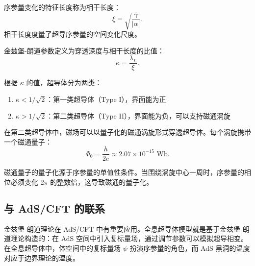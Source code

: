 \begin{definition}[相干长度]
序参量变化的特征长度称为相干长度：
\begin{equation}
    \xi = \sqrt{\frac{\gamma}{|\alpha|}}.
\end{equation}
相干长度度量了超导序参量的空间变化尺度。
\end{definition}

\begin{definition}
金兹堡-朗道参数定义为穿透深度与相干长度的比值：
\begin{equation}
    \kappa = \frac{\lambda_L}{\xi}.
\end{equation}
\end{definition}

\begin{property}[超导体分类]
根据 $\kappa$ 的值，超导体分为两类：
\begin{enumerate}
    \item $\kappa < 1/\sqrt{2}$：第一类超导体（Type I），界面能为正
    \item $\kappa > 1/\sqrt{2}$：第二类超导体（Type II），界面能为负，可以支持磁通涡旋
\end{enumerate}
\end{property}

\begin{definition}[磁通量子]
在第二类超导体中，磁场可以以量子化的磁通涡旋形式穿透超导体。每个涡旋携带一个磁通量子：
\begin{equation}
    \Phi_0 = \frac{h}{2e} \approx 2.07 \times 10^{-15} \text{ Wb}.
\end{equation}
\end{definition}

\begin{remark}
磁通量子的量子化源于序参量的单值性条件。当围绕涡旋中心一周时，序参量的相位必须变化 $2\pi$ 的整数倍，这导致磁通的量子化。
\end{remark}

\subsection{与 AdS/CFT 的联系}

\begin{remark}
金兹堡-朗道理论在 AdS/CFT 中有重要应用。全息超导体模型就是基于金兹堡-朗道理论构造的：在 AdS 空间中引入复标量场，通过调节参数可以模拟超导相变。在全息超导体中，体空间中的复标量场 $\psi$ 扮演序参量的角色，而 AdS 黑洞的温度对应于边界理论的温度。
\end{remark}

